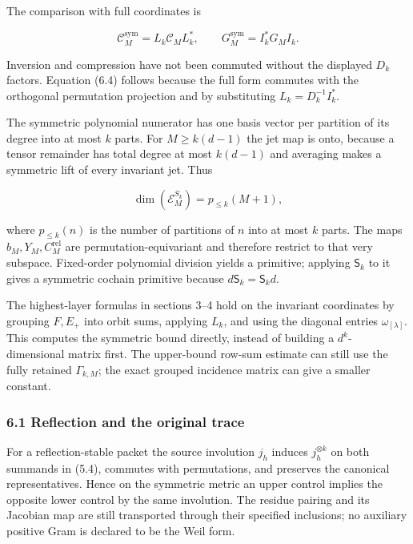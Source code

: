 The comparison with full coordinates is

\[\boxed{\mathcal C_M^{\mathrm{sym}}=L_k\mathcal C_ML_k^*,\qquad
G_M^{\mathrm{sym}}=I_k^*G_MI_k.}\tag{6.4}\]

Inversion and compression have not been commuted without the displayed
\(D_k\) factors. Equation (6.4) follows because the full form commutes
with the orthogonal permutation projection and by substituting
\(L_k=D_k^{-1}I_k^*\).

The symmetric polynomial numerator has one basis vector per partition of
its degree into at most \(k\) parts. For \(M\ge k(d-1)\) the jet map is
onto, because a tensor remainder has total degree at most \(k(d-1)\) and
averaging makes a symmetric lift of every invariant jet. Thus

\[\boxed{\dim(\mathcal E_M^{S_k})=p_{\le k}(M+1),}\tag{6.5}\]

where \(p_{\le k}(n)\) is the number of partitions of \(n\) into at most
\(k\) parts. The maps \(b_M,Y_M,C_M^{\mathrm{rel}}\) are
permutation-equivariant and therefore restrict to that very subspace.
Fixed-order polynomial division yields a primitive; applying
\(\mathsf S_k\) to it gives a symmetric cochain primitive because
\(d\mathsf S_k=\mathsf S_kd\).

The highest-layer formulas in sections 3--4 hold on the invariant
coordinates by grouping \(F,E_+\) into orbit sums, applying \(L_k\), and
using the diagonal entries \(\omega_{[\lambda]}\). This computes the
symmetric bound directly, instead of building a \(d^k\)-dimensional
matrix first. The upper-bound row-sum estimate can still use the fully
retained \(\Gamma_{k,M}\); the exact grouped incidence matrix can give a
smaller constant.

\subsubsection{6.1 Reflection and the original
trace}\label{symmetric_frontier:reflection-and-the-original-trace}

For a reflection-stable packet the source involution \(j_h\) induces
\(j_h^{\otimes k}\) on both summands in (5.4), commutes with
permutations, and preserves the canonical representatives. Hence on the
symmetric metric an upper control implies the opposite lower control by
the same involution. The residue pairing and its Jacobian map are still
transported through their specified inclusions; no auxiliary positive
Gram is declared to be the Weil form.

